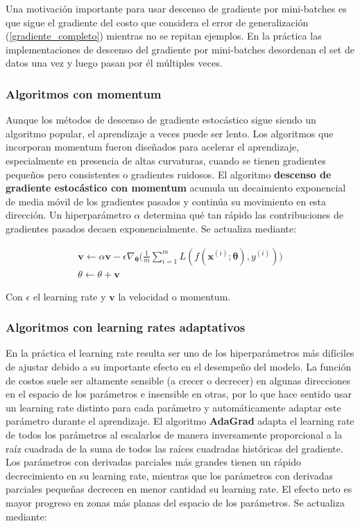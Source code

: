 Una motivaci\'on importante para usar descenso de gradiente por mini-batches es que sigue el gradiente del costo que considera el error de generalizaci\'on (\ref{gradiente_completo}) mientras no se repitan ejemplos. En la pr\'actica las implementaciones de descenso del gradiente por mini-batches desordenan el set de datos una vez y luego pasan por \'el m\'ultiples veces.

\subsubsection{Algoritmos con momentum}

Aunque los métodos de descenso de gradiente estoc\'astico sigue siendo un algoritmo popular, el aprendizaje a veces puede ser lento. Los algoritmos que incorporan momentum fueron dise{\~{n}}ados para acelerar el aprendizaje, especialmente en presencia de altas curvaturas, cuando se tienen gradientes peque{\~{n}}os pero consistentes o gradientes ruidosos. El algoritmo \textbf{descenso de gradiente estoc\'astico con momentum} acumula un decaimiento exponencial de media m\'ovil de los gradientes pasados y contin\'ua su movimiento en esta direcci\'on. Un hiperpar\'ametro $\alpha$ determina qu\'e tan r\'apido las contribuciones de gradientes pasados decaen exponencialmente. Se actualiza mediante:

\begin{gather*}
\bm{v} \longleftarrow \alpha\bm{v} - \epsilon\nabla_{\bm{\theta}}\Big(\frac{1}{m}\sum_{i=1}^{m}L(f(\bm{x}^{(i)};\bm{\theta}),y^{(i)})\Big)
\\
\theta \longleftarrow \theta + \bm{v}
\end{gather*}

Con $\epsilon$ el learning rate y $\bm{v}$ la velocidad o momentum.

\subsubsection{Algoritmos con learning rates adaptativos}

En la pr\'actica el learning rate resulta ser uno de los hiperpar\'ametros m\'as dif\'iciles de ajustar debido a su importante efecto en el desempe{\~{n}}o del modelo. La funci\'on de costos suele ser altamente sensible (a crecer o decrecer) en algunas direcciones en el espacio de los par\'ametros e insensible en otras, por lo que hace sentido usar un learning rate distinto para cada par\'ametro y autom\'aticamente adaptar este par\'ametro durante el aprendizaje. El algoritmo \textbf{AdaGrad} adapta el learning rate de todos los par\'ametros al escalarlos de manera inversamente proporcional a la ra\'iz cuadrada de la suma de todos las ra\'ices cuadradas hist\'oricas del gradiente. Los par\'ametros con derivadas parciales m\'as grandes tienen un r\'apido decrecimiento en su learning rate, mientras que los par\'ametros con derivadas parciales peque{\~{n}}as decrecen en menor cantidad su learning rate. El efecto neto es mayor progreso en zonas m\'as planas del espacio de los par\'ametros. Se actualiza mediante:

